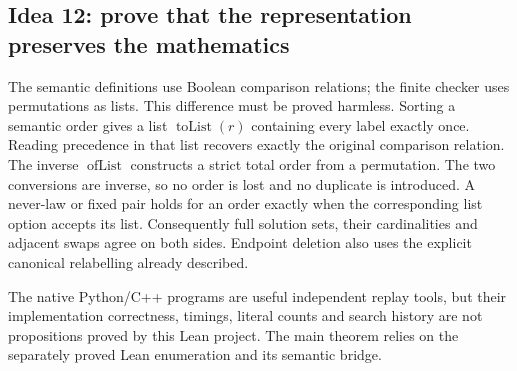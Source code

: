 \subsection{Idea 12: prove that the representation preserves the mathematics}\label{sec:bridge}
The semantic definitions use Boolean comparison relations; the finite
checker uses permutations as lists. This difference must be proved
harmless. Sorting a semantic order gives a list \(\operatorname{toList}(r)\)
containing every label exactly once. Reading precedence in that list
recovers exactly the original comparison relation. The inverse
\(\operatorname{ofList}\) constructs a strict total order from a
permutation. The two conversions are inverse, so no order is lost
and no duplicate is introduced. A never-law or fixed pair holds for
an order exactly when the corresponding list option accepts its list.
Consequently full solution sets, their cardinalities and adjacent
swaps agree on both sides. Endpoint deletion also uses the explicit
canonical relabelling already described.


The native Python/C++ programs are useful independent replay tools,
but their implementation correctness, timings, literal counts and
search history are not propositions proved by this Lean project.
The main theorem relies on the separately proved Lean enumeration
and its semantic bridge.
